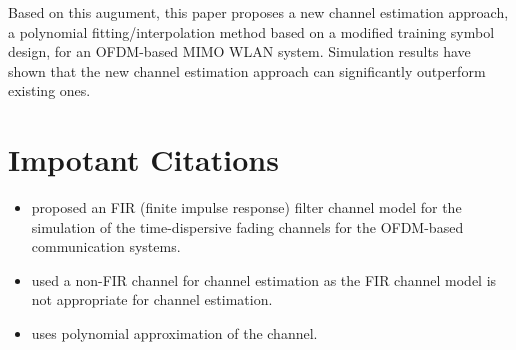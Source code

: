 \documentclass[11pt,draftnofoot,onecolumn]{IEEEtran}
\begin{document}
Based on this augument, this paper proposes a new channel estimation approach,
a polynomial fitting/interpolation
method based on a modified training symbol design,
for an OFDM-based MIMO WLAN system.
Simulation results have
shown that the new channel estimation approach can significantly
outperform existing ones.


\section*{Impotant Citations}

\begin{itemize}

\item \cite{Chayat1997} proposed an FIR (finite impulse response)
filter channel model for the simulation of the time-dispersive fading channels for the
OFDM-based communication systems.

\item \cite{LiuLi2004} used a non-FIR channel for channel estimation as the FIR channel model is not appropriate for channel estimation. 

\item \cite{WangLiu2002} uses polynomial approximation of the channel.


\end{itemize}




\end{document}
